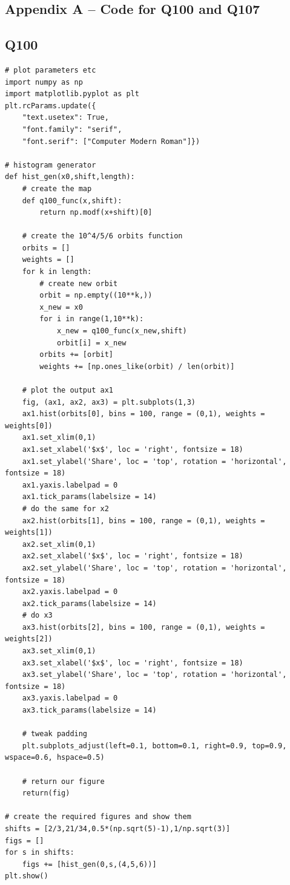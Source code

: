 \documentclass{article}
\begin{document}
\begin{appendices}
\section*{Appendix A -- Code for Q100 and Q107}
\subsection*{Q100}
\begin{verbatim}
# plot parameters etc
import numpy as np
import matplotlib.pyplot as plt
plt.rcParams.update({
    "text.usetex": True,
    "font.family": "serif",
    "font.serif": ["Computer Modern Roman"]})

# histogram generator
def hist_gen(x0,shift,length):
    # create the map
    def q100_func(x,shift):
        return np.modf(x+shift)[0]
    
    # create the 10^4/5/6 orbits function
    orbits = []
    weights = []
    for k in length:
        # create new orbit 
        orbit = np.empty((10**k,))
        x_new = x0
        for i in range(1,10**k):
            x_new = q100_func(x_new,shift)
            orbit[i] = x_new
        orbits += [orbit]
        weights += [np.ones_like(orbit) / len(orbit)]

    # plot the output ax1
    fig, (ax1, ax2, ax3) = plt.subplots(1,3)
    ax1.hist(orbits[0], bins = 100, range = (0,1), weights = weights[0])
    ax1.set_xlim(0,1)
    ax1.set_xlabel('$x$', loc = 'right', fontsize = 18)
    ax1.set_ylabel('Share', loc = 'top', rotation = 'horizontal', fontsize = 18)
    ax1.yaxis.labelpad = 0
    ax1.tick_params(labelsize = 14)
    # do the same for x2
    ax2.hist(orbits[1], bins = 100, range = (0,1), weights = weights[1])
    ax2.set_xlim(0,1)
    ax2.set_xlabel('$x$', loc = 'right', fontsize = 18)
    ax2.set_ylabel('Share', loc = 'top', rotation = 'horizontal', fontsize = 18)
    ax2.yaxis.labelpad = 0
    ax2.tick_params(labelsize = 14)
    # do x3
    ax3.hist(orbits[2], bins = 100, range = (0,1), weights = weights[2])
    ax3.set_xlim(0,1)
    ax3.set_xlabel('$x$', loc = 'right', fontsize = 18)
    ax3.set_ylabel('Share', loc = 'top', rotation = 'horizontal', fontsize = 18)
    ax3.yaxis.labelpad = 0
    ax3.tick_params(labelsize = 14)

    # tweak padding
    plt.subplots_adjust(left=0.1, bottom=0.1, right=0.9, top=0.9, wspace=0.6, hspace=0.5)

    # return our figure
    return(fig)

# create the required figures and show them
shifts = [2/3,21/34,0.5*(np.sqrt(5)-1),1/np.sqrt(3)]
figs = []
for s in shifts:
    figs += [hist_gen(0,s,(4,5,6))]
plt.show()
\end{verbatim}

\end{appendices}
\end{document}
